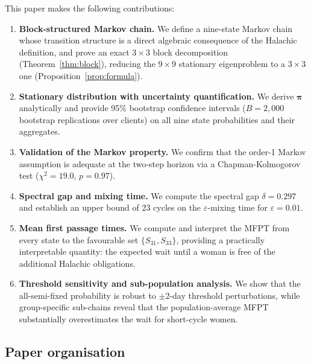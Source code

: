 \documentclass[12pt,a4paper]{article}
\newcommand{\piv}{\boldsymbol{\pi}}
\begin{document}
This paper makes the following contributions:

\begin{enumerate}
  \item \textbf{Block-structured Markov chain.}  We define a nine-state
        Markov chain whose transition structure is a direct algebraic consequence
        of the Halachic definition, and prove an exact $3\times3$ block
        decomposition (Theorem~\ref{thm:block}), reducing the $9\times9$
        stationary eigenproblem to a $3\times3$ one (Proposition~\ref{prop:formula}).

  \item \textbf{Stationary distribution with uncertainty quantification.}
        We derive $\piv$ analytically and provide 95\% bootstrap confidence
        intervals ($B = 2{,}000$ bootstrap replications over clients) on all nine
        state probabilities and their aggregates.

  \item \textbf{Validation of the Markov property.}  We confirm that the
        order-1 Markov assumption is adequate at the two-step horizon via a
        Chapman-Kolmogorov test ($\chi^2 = 19.0$, $p = 0.97$).

  \item \textbf{Spectral gap and mixing time.}  We compute the spectral gap
        $\delta = 0.297$ and establish an upper bound of 23 cycles on the
        $\varepsilon$-mixing time for $\varepsilon = 0.01$.

  \item \textbf{Mean first passage times.}  We compute and interpret the MFPT
        from every state to the favourable set $\{S_{31}, S_{33}\}$, providing
        a practically interpretable quantity: the expected wait until a woman is
        free of the additional Halachic obligations.

  \item \textbf{Threshold sensitivity and sub-population analysis.}
        We show that the all-semi-fixed probability is robust to $\pm2$-day
        threshold perturbations, while group-specific sub-chains reveal that the
        population-average MFPT substantially overestimates the wait for
        short-cycle women.
\end{enumerate}

\subsection*{Paper organisation}
\end{document}
